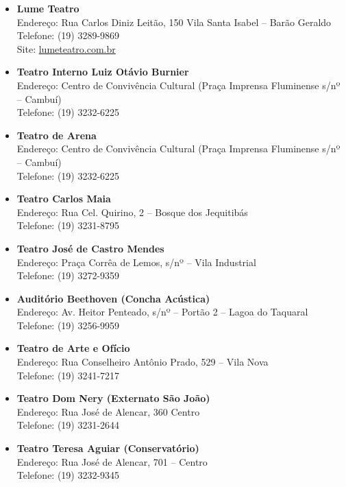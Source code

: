 \begin{itemize}
\item   \textbf{Lume Teatro}
		\\Endereço:  Rua Carlos Diniz Leitão, 150 Vila Santa Isabel -- Barão Geraldo
		\\Telefone: (19) 3289-9869
		\\Site: \url{lumeteatro.com.br}

\item   \textbf{Teatro Interno Luiz Otávio Burnier}
		\\Endereço: Centro de Convivência Cultural (Praça Imprensa Fluminense s/nº -- Cambuí)
		\\Telefone: (19) 3232-6225

\item   \textbf{Teatro de Arena}
		\\Endereço: Centro de Convivência Cultural (Praça Imprensa Fluminense s/nº -- Cambuí)
		\\Telefone: (19) 3232-6225

\item   \textbf{Teatro Carlos Maia}
		\\Endereço: Rua Cel. Quirino, 2 -- Bosque dos Jequitibás
		\\Telefone: (19) 3231-8795

\item   \textbf{Teatro José de Castro Mendes}
		\\Endereço: Praça Corrêa de Lemos, s/nº -- Vila Industrial
		\\Telefone: (19) 3272-9359

\item   \textbf{Auditório Beethoven (Concha Acústica)}
		\\Endereço: Av. Heitor Penteado, s/nº -- Portão 2 -- Lagoa do Taquaral
		\\Telefone: (19) 3256-9959

\item   \textbf{Teatro de Arte e Ofício}
		\\Endereço: Rua Conselheiro Antônio Prado, 529 -- Vila Nova
		\\Telefone: (19) 3241-7217

\item   \textbf{Teatro Dom Nery (Externato São João)}
		\\Endereço: Rua José de Alencar, 360  Centro
		\\Telefone: (19) 3231-2644

\item   \textbf{Teatro Teresa Aguiar (Conservatório)}
		\\Endereço: Rua José de Alencar, 701 -- Centro
		\\Telefone: (19) 3232-9345


\end{itemize}
